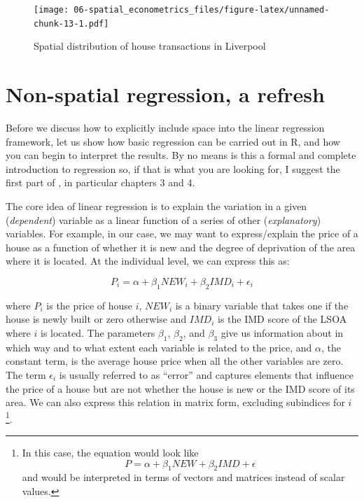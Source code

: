 \documentclass[
]{book}
\begin{document}
\begin{figure}
\centering
\texttt{[image: 06-spatial\_econometrics\_files/figure-latex/unnamed-chunk-13-1.pdf]}
\caption{\label{fig:unnamed-chunk-13}Spatial distribution of house transactions in Liverpool}
\end{figure}

\hypertarget{non-spatial-regression-a-refresh}{%
\section{Non-spatial regression, a refresh}\label{non-spatial-regression-a-refresh}}

Before we discuss how to explicitly include space into the linear regression framework, let us show how basic regression can be carried out in R, and how you can begin to interpret the results. By no means is this a formal and complete introduction to regression so, if that is what you are looking for, I suggest the first part of \citet{gelman2006data}, in particular chapters 3 and 4.

The core idea of linear regression is to explain the variation in a given (\emph{dependent}) variable as a linear function of a series of other (\emph{explanatory}) variables. For example, in our case, we may want to express/explain the price of a house as a function of whether it is new and the degree of deprivation of the area where it is located. At the individual level, we can express this as:

\[
P_i = \alpha + \beta_1 NEW_i + \beta_2 IMD_i + \epsilon_i
\]

where \(P_i\) is the price of house \(i\), \(NEW_i\) is a binary variable that takes one if the house is newly built or zero otherwise and \(IMD_i\) is the IMD score of the LSOA where \(i\) is located. The parameters \(\beta_1\), \(\beta_2\), and \(\beta_3\) give us information about in which way and to what extent each variable is related to the price, and \(\alpha\), the constant term, is the average house price when all the other variables are zero. The term \(\epsilon_i\) is usually referred to as ``error'' and captures elements that influence the price of a house but are not whether the house is new or the IMD score of its area. We can also express this relation in matrix form, excluding subindices for \(i\)\footnote{In this case, the equation would look like \[P = \alpha + \beta_1 NEW + \beta_2 IMD + \epsilon\] and would be interpreted in terms of vectors and matrices instead of scalar values.}.
\end{document}
